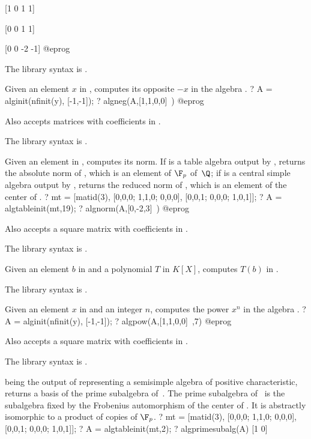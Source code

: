 [1  0  1  1]

[0  0  1  1]

[0  0 -2 -1]
@eprog

The library syntax is .

\label{se:algneg}
Given an element $x$ in , computes its opposite $-x$ in the
algebra .
\bprog
? A = alginit(nfinit(y), [-1,-1]);
? algneg(A,[1,1,0,0]~)
@eprog

Also accepts matrices with coefficients in .

The library syntax is .

\label{se:algnorm}
Given an element  in , computes its norm. If  is
a table algebra output by , returns the absolute norm of
, which is an element of $\F_p$ of~$\Q$; if  is a central
simple algebra output by , returns the reduced norm of ,
which is an element of the center of .
\bprog
? mt = [matid(3), [0,0,0; 1,1,0; 0,0,0], [0,0,1; 0,0,0; 1,0,1]];
? A = algtableinit(mt,19);
? algnorm(A,[0,-2,3]~)
@eprog

Also accepts a square matrix with coefficients in .

The library syntax is .

\label{se:algpoleval}
Given an element $b$ in  and a polynomial $T$ in $K[X]$,
computes $T(b)$ in .

The library syntax is .

\label{se:algpow}
Given an element $x$ in  and an integer $n$, computes the
power $x^n$ in the algebra .
\bprog
? A = alginit(nfinit(y), [-1,-1]);
? algpow(A,[1,1,0,0]~,7)
@eprog

Also accepts a square matrix with coefficients in .

The library syntax is .

\label{se:algprimesubalg}
 being the output of  representing a semisimple
algebra of positive characteristic, returns a basis of the prime subalgebra
of~. The prime subalgebra of~ is the subalgebra fixed by the
Frobenius automorphism of the center of . It is abstractly isomorphic
to a product of copies of $\F_p$.
\bprog
? mt = [matid(3), [0,0,0; 1,1,0; 0,0,0], [0,0,1; 0,0,0; 1,0,1]];
? A = algtableinit(mt,2);
? algprimesubalg(A)
[1 0]

